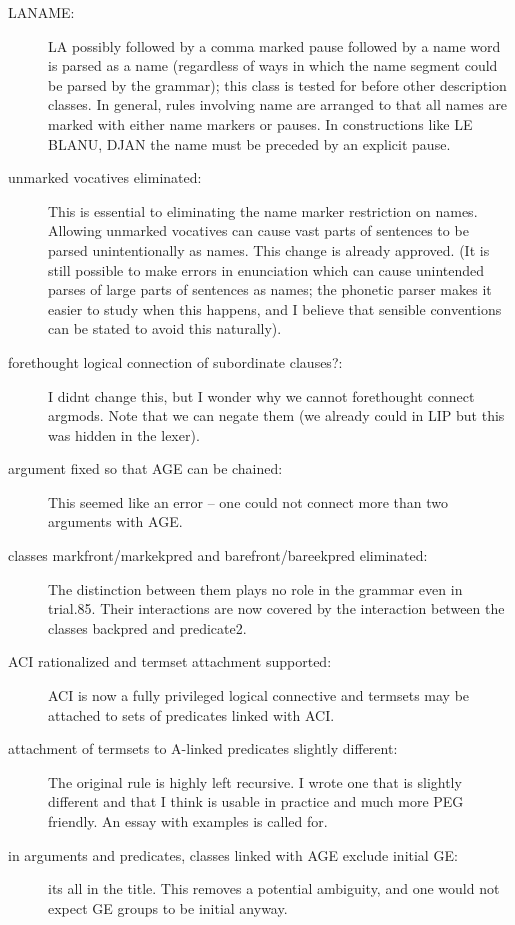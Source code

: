 \documentclass[12pt]{article}
\begin{document}
\begin{description}
\begin{description}
\item[LANAME:]  LA possibly followed by a comma marked pause followed by a name word is parsed as a name (regardless of
ways in which the name segment could be parsed by the grammar); this class is tested for before other description classes.  In general, rules involving name are arranged to that all names are marked with either name markers or pauses.   In constructions like LE BLANU, DJAN the name must be preceded by an explicit pause.

\item[unmarked vocatives eliminated:]  This is essential to eliminating the name marker restriction on names.  Allowing unmarked vocatives
can cause vast parts of sentences to be parsed unintentionally as names.   This change is already approved.  (It is still possible
to make errors in enunciation which can cause unintended parses of large parts of sentences as names; the phonetic parser makes it easier to study when this happens, and I believe that sensible conventions can be stated to avoid this naturally).

\item[forethought logical connection of subordinate clauses?:]  I didnt change this, but I wonder why we cannot forethought connect argmods.  Note that we can negate them (we already could in LIP but this was hidden in the lexer).

\item[argument fixed so that AGE can be chained:]  This seemed like an error -- one could not connect more than two arguments with AGE.

\item[classes markfront/markekpred and barefront/bareekpred eliminated:]   The distinction between them plays no role in the grammar even in trial.85.
Their interactions are now covered by the interaction between the classes backpred and predicate2.

\item[ACI rationalized and termset attachment supported:]  ACI is now a fully privileged logical connective and termsets may
be attached to sets of predicates linked with ACI.

\item[attachment of termsets to A-linked predicates slightly different:]   The original rule is highly left recursive.
I wrote one that is slightly different and that I think is usable in practice and much more PEG friendly.  An essay with examples is called for. 

\item[in arguments and predicates, classes linked with AGE exclude initial GE:]  its all in the title.  This removes a potential ambiguity, and one
would not expect GE groups to be initial anyway.


\end{description}
\end{description}
\end{document}
